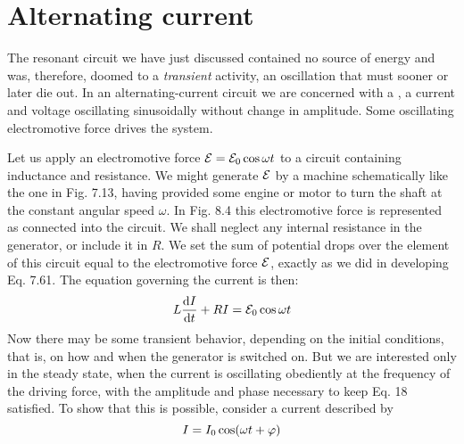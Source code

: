 \section{Alternating current}

The resonant circuit we have just discussed contained no source
of energy and was, therefore, doomed to a \emph{transient}
activity, an
oscillation that must sooner or later die out. In an 
alternating-current circuit we are concerned with a , a current and
voltage oscillating sinusoidally without change in amplitude. Some
oscillating electromotive force drives the system.

Let us apply an electromotive force $\mathcal{E} = \mathcal{E}_0 \cos \omega t$ to a circuit containing
inductance and resistance. We might generate $\mathcal{E}$ by a
machine schematically like the one in Fig. 7.13, having provided
some engine or motor to turn the shaft at the constant angular
speed $\omega$. In Fig. 8.4 this electromotive force is represented as connected
into the circuit. We shall neglect any internal resistance in
the generator, or include it in $R$. We set the sum of potential drops
over the element of this circuit equal to the electromotive force $\mathcal{E}$,
exactly as we did in developing Eq. 7.61. The equation governing
the current is then:
\begin{equation}
  L\frac{\textup{d} I}{\textup{d} t} + RI = \mathcal{E}_0\cos\omega t
\end{equation}
Now there may be some transient behavior, depending on the
initial conditions, that is, on how and when the generator is switched
on. But we are interested only in the steady state, when the current
is oscillating obediently at the frequency of the driving force, with
the amplitude and phase necessary to keep Eq. 18 satisfied. To show
that this is possible, consider a current described by
\begin{equation}
  I = I_0 \cos (\omega t + \varphi)
\end{equation}

